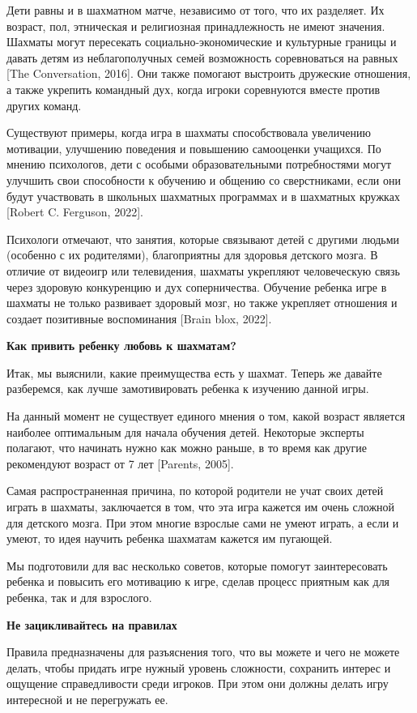 Дети равны и в шахматном матче, независимо от того, что их разделяет. Их возраст, пол, этническая и религиозная принадлежность не имеют значения. Шахматы могут пересекать социально-экономические и культурные границы и давать детям из неблагополучных семей возможность соревноваться на равных [The Conversation, 2016]. Они также помогают выстроить дружеские отношения, а также укрепить командный дух, когда игроки соревнуются вместе против других команд.

Существуют примеры, когда игра в шахматы способствовала увеличению мотивации, улучшению поведения и повышению самооценки учащихся. По мнению психологов, дети с особыми образовательными потребностями могут улучшить свои способности к обучению и общению со сверстниками, если они будут участвовать в школьных шахматных программах и в шахматных кружках [Robert C. Ferguson, 2022].

Психологи отмечают, что занятия, которые связывают детей с другими людьми (особенно с их родителями), благоприятны для здоровья детского мозга. В отличие от видеоигр или телевидения, шахматы укрепляют человеческую связь через здоровую конкуренцию и дух соперничества. Обучение ребенка игре в шахматы не только развивает здоровый мозг, но также укрепляет отношения и создает позитивные воспоминания [Brain blox, 2022].

\textbf{Как привить ребенку любовь к шахматам?}

Итак, мы выяснили, какие преимущества есть у шахмат. Теперь же давайте разберемся, как лучше замотивировать ребенка к изучению данной игры.

На данный момент не существует единого мнения о том, какой возраст является наиболее оптимальным для начала обучения детей. Некоторые эксперты полагают, что начинать нужно как можно раньше, в то время как другие рекомендуют возраст от 7 лет [Parents, 2005].

Самая распространенная причина, по которой родители не учат своих детей играть в шахматы, заключается в том, что эта игра кажется им очень сложной для детского мозга. При этом многие взрослые сами не умеют играть, а если и умеют, то идея научить ребенка шахматам кажется им пугающей.

Мы подготовили для вас несколько советов, которые помогут заинтересовать ребенка и повысить его мотивацию к игре, сделав процесс приятным как для ребенка, так и для взрослого.

\textbf{Не зацикливайтесь на правилах}

Правила предназначены для разъяснения того, что вы можете и чего не можете делать, чтобы придать игре нужный уровень сложности, сохранить интерес и ощущение справедливости среди игроков. При этом они должны делать игру интересной и не перегружать ее.

